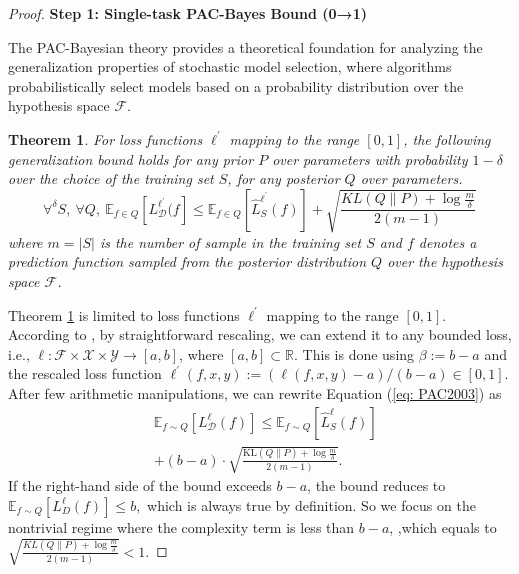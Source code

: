 \documentclass[letterpaper]{article} %
\newtheorem{theorem}{Theorem}
\begin{document}
\begin{proof}
\textbf{Step 1: Single-task PAC-Bayes Bound (0→1)}

The PAC-Bayesian theory provides a theoretical foundation for analyzing the generalization properties of stochastic model selection, where algorithms probabilistically select models based on a probability distribution over the hypothesis space \(\mathcal{F}\). 


\begin{theorem} \label{the: PAC1999}
\citep{mcallesterPACBayesianStochasticModel2003}
For loss functions $\ell^{'}$ mapping to the range $[0,1]$, the following generalization bound holds for any prior $P$ over parameters with probability $1 - \delta$ over the choice of the training set $S$, for any posterior $Q$ over parameters.
\begin{equation}\label{eq: PAC2003}
     \forall^{\delta}S,\ \forall Q,\ \mathbb{E}_{f \in Q}[L_{\mathcal{D}}^{\ell^{'}}(f] \leq  \mathbb{E}_{f \in Q}[\hat{L}^{\ell^{'}}_{S}(f)] +\sqrt{\frac{KL(Q\|P)+\log \frac{m}{\delta}}{2(m-1)}}
\end{equation}
where $m=|S|$ is the number of sample in the training set $S$ and $f$ denotes a prediction function sampled from the posterior distribution $Q$ over the hypothesis space $\mathcal{F}$.
\end{theorem}

Theorem \ref{the: PAC1999} is limited to loss functions $\ell^{'}$ mapping to the range $[0,1]$. According to \citep{germainPACBayesianTheoryMeets2016}, by straightforward rescaling, we can extend it to any bounded loss, i.e., $\ell: \mathcal{F} \times \mathcal{X} \times \mathcal{Y} \rightarrow[a, b]$, where $[a, b] \subset \mathbb{R}$. This is done using $\beta:=b-a$ and the rescaled loss function $\ell^{\prime}(f, x, y):=(\ell(f, x, y)-a) /(b-a) \in[0,1]$. After few arithmetic manipulations, we can rewrite Equation (\ref{eq: PAC2003}) as
\begin{equation}
\begin{aligned}
        &\mathbb{E}_{f \sim Q}[{L}_\mathcal{D}^{\ell}(f)] \leq \mathbb{E}_{f\sim Q}[\widehat{{L}}_S^{\ell}(f)] \\
        &+ (b - a) \cdot \sqrt{\frac{\mathrm{KL}(Q \| P) + \log \frac{m}{\delta}}{2(m - 1)}} .
\end{aligned}
\end{equation}
If the right-hand side of the bound exceeds $b-a$, the bound reduces to
$\mathbb{E}_{f \sim Q}[L_D^{\ell}(f)] \leq b,$
which is always true by definition. So we focus on the nontrivial regime where the complexity term is less than $b-a$, ,which equals to
$\sqrt{\frac{KL(Q\|P)+\log \frac{m}{\delta}}{2(m-1)}} <1. $


\end{proof}
\end{document}
